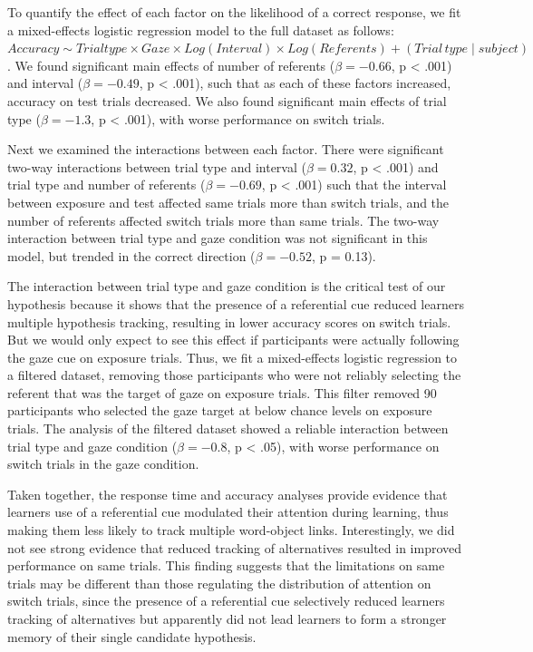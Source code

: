 \documentclass[12pt,]{article}
\begin{document}
To quantify the effect of each factor on the likelihood of a correct
response, we fit a mixed-effects logistic regression model to the full
dataset as follows:
\(Accuracy \sim Trial type \times Gaze \times Log(Interval) \times Log(Referents) + (Trial \, type \mid subject)\).
We found significant main effects of number of referents
(\(\beta = -0.66\), p \textless{} .001) and interval (\(\beta = -0.49\),
p \textless{} .001), such that as each of these factors increased,
accuracy on test trials decreased. We also found significant main
effects of trial type (\(\beta = -1.3\), p \textless{} .001), with worse
performance on switch trials.

Next we examined the interactions between each factor. There were
significant two-way interactions between trial type and interval
(\(\beta = 0.32\), p \textless{} .001) and trial type and number of
referents (\(\beta = -0.69\), p \textless{} .001) such that the interval
between exposure and test affected same trials more than switch trials,
and the number of referents affected switch trials more than same
trials. The two-way interaction between trial type and gaze condition
was not significant in this model, but trended in the correct direction
(\(\beta = -0.52\), p = 0.13).

The interaction between trial type and gaze condition is the critical
test of our hypothesis because it shows that the presence of a
referential cue reduced learners multiple hypothesis tracking, resulting
in lower accuracy scores on switch trials. But we would only expect to
see this effect if participants were actually following the gaze cue on
exposure trials. Thus, we fit a mixed-effects logistic regression to a
filtered dataset, removing those participants who were not reliably
selecting the referent that was the target of gaze on exposure trials.
This filter removed 90 participants who selected the gaze target at
below chance levels on exposure trials. The analysis of the filtered
dataset showed a reliable interaction between trial type and gaze
condition (\(\beta = -0.8\), p \textless{} .05), with worse performance
on switch trials in the gaze condition.

Taken together, the response time and accuracy analyses provide evidence
that learners use of a referential cue modulated their attention during
learning, thus making them less likely to track multiple word-object
links. Interestingly, we did not see strong evidence that reduced
tracking of alternatives resulted in improved performance on same
trials. This finding suggests that the limitations on same trials may be
different than those regulating the distribution of attention on switch
trials, since the presence of a referential cue selectively reduced
learners tracking of alternatives but apparently did not lead learners
to form a stronger memory of their single candidate hypothesis.
\end{document}
